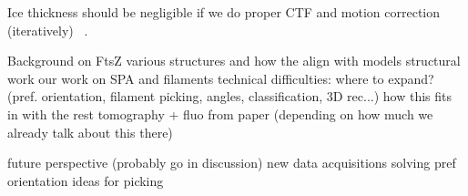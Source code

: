 Ice thickness should be negligible if we do proper CTF and motion correction (iteratively) ~\cite{aiyerOvercomingResolutionAttenuation2024}.

\begin{outline}
\1 Background on FtsZ
    \2 various structures and how the align with models
\1 structural work
    \2 our work on SPA and filaments
        \3 technical difficulties: where to expand? (pref. orientation, filament picking, angles, classification, 3D rec...)
    \2 how this fits in with the rest
    \2 tomography + fluo from paper (depending on how much we already talk about this there)

\1 future perspective (probably go in discussion)
    \2 new data acquisitions
    \2 solving pref orientation
    \2 ideas for picking
\end{outline}

